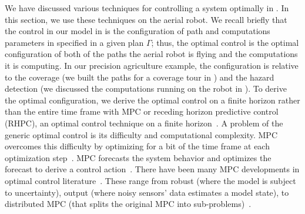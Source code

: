 We have discussed various techniques for controlling a system optimally in . In this section, we use these techniques on the aerial robot. We recall briefly that the control in our model in  is the configuration of path and computations parameters in  specified in a given plan $\Gamma$; thus, the optimal control is the optimal configuration of both of the paths the aerial robot is flying and the computations it is computing. In our precision agriculture example, the configuration is relative to the coverage (we built the paths for a coverage tour in ) and the hazard detection (we discussed the computations running on the robot in ). To derive the optimal configuration, we derive the optimal control on a finite horizon rather than the entire time frame with MPC or receding horizon predictive control (RHPC), an optimal control technique on a finite horizon~\citep{camacho2007model}. A problem of the generic optimal control is its difficulty and computational complexity. MPC overcomes this difficulty by optimizing for a bit of the time frame at each optimization step~\citep{camacho2007model}. MPC forecasts the system behavior and optimizes the forecast to derive a control action~\citep{rawlings2017model}. There have been many MPC developments in optimal control literature~\citep{rawlings2017model}. These range from robust (where the model is subject to uncertainty), output (where noisy sensors' data estimates a model state), to distributed MPC (that splits the original MPC into sub-problems)~\citep{camacho2007model,rawlings2017model,kwon2006receding,rossiter2004model,wang2009model}.

